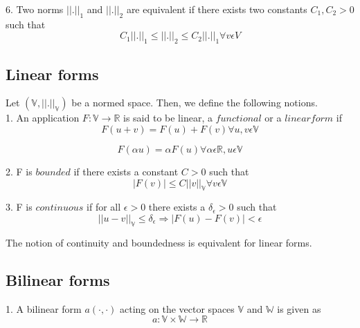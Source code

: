 \documentclass[a4paper,10pt]{book}
\begin{document}
6. Two norms $||.||_1$ and $||.||_2$ are equivalent if there exists two constants $C_1,C_2 > 0$ such that \\

\begin{equation} \label{norm_equivalent}
C_1||.||_1 \leq ||.||_2 \leq C_2 ||.||_1 \forall v \epsilon V
\end{equation}

\subsection{Linear forms}

Let $(\mathbb{V,||.||_\mathbb{V}})$ be a normed space. Then, we define the following notions.\\

1. An application $F : \mathbb{V} \rightarrow \mathbb{R}$ is said to be linear, a $functional$ or a $linear form$ if  \\

\begin{equation} 
F(u+v) = F(u) + F(v) \forall u,v \epsilon \mathbb{V} 
\end{equation}

\begin{equation} 
F(\alpha u) = \alpha F(u) \forall \alpha \epsilon \mathbb{R}, u \epsilon \mathbb{V}
\end{equation}

2. F is $bounded$ if there exists a constant $C > 0$ such that\\ 
\begin{equation} 
|F(v)| \leq C ||v||_\mathbb{V} \forall v \epsilon \mathbb{V}
\end{equation}

3. F is $continuous$ if for all $\epsilon > 0$ there exists a $\delta_\epsilon > 0$ such that \\
\begin{equation}
||u - v||_\mathbb{V} \leq \delta_\epsilon \Rightarrow  |F(u) - F(v)| < \epsilon
\end{equation}

The notion of continuity and boundedness is equivalent for linear forms.

\subsection{Bilinear forms}

1. A bilinear form $a(\cdot,\cdot)$ acting on the vector spaces $\mathbb{V}$ and $\mathbb{W}$ is given as\\
\begin{equation}
a : \mathbb{V} \times \mathbb{W} \rightarrow \mathbb{R}
\end{equation}
\end{document}
